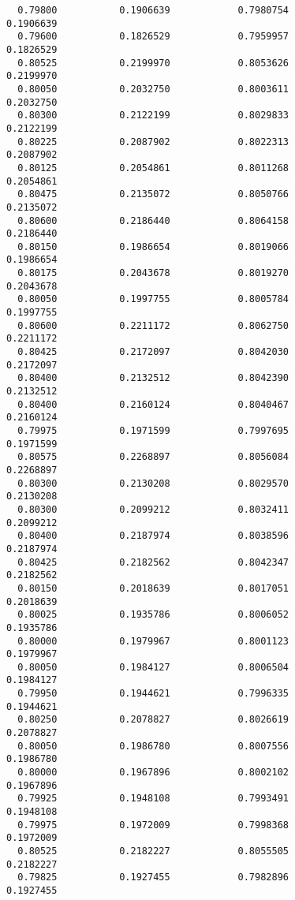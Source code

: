 \documentclass[
  letterpaper,
  DIV=11,
  numbers=noendperiod]{scrartcl}
\begin{document}
\begin{verbatim}
  0.79800           0.1906639            0.7980754            0.1906639     
  0.79600           0.1826529            0.7959957            0.1826529     
  0.80525           0.2199970            0.8053626            0.2199970     
  0.80050           0.2032750            0.8003611            0.2032750     
  0.80300           0.2122199            0.8029833            0.2122199     
  0.80225           0.2087902            0.8022313            0.2087902     
  0.80125           0.2054861            0.8011268            0.2054861     
  0.80475           0.2135072            0.8050766            0.2135072     
  0.80600           0.2186440            0.8064158            0.2186440     
  0.80150           0.1986654            0.8019066            0.1986654     
  0.80175           0.2043678            0.8019270            0.2043678     
  0.80050           0.1997755            0.8005784            0.1997755     
  0.80600           0.2211172            0.8062750            0.2211172     
  0.80425           0.2172097            0.8042030            0.2172097     
  0.80400           0.2132512            0.8042390            0.2132512     
  0.80400           0.2160124            0.8040467            0.2160124     
  0.79975           0.1971599            0.7997695            0.1971599     
  0.80575           0.2268897            0.8056084            0.2268897     
  0.80300           0.2130208            0.8029570            0.2130208     
  0.80300           0.2099212            0.8032411            0.2099212     
  0.80400           0.2187974            0.8038596            0.2187974     
  0.80425           0.2182562            0.8042347            0.2182562     
  0.80150           0.2018639            0.8017051            0.2018639     
  0.80025           0.1935786            0.8006052            0.1935786     
  0.80000           0.1979967            0.8001123            0.1979967     
  0.80050           0.1984127            0.8006504            0.1984127     
  0.79950           0.1944621            0.7996335            0.1944621     
  0.80250           0.2078827            0.8026619            0.2078827     
  0.80050           0.1986780            0.8007556            0.1986780     
  0.80000           0.1967896            0.8002102            0.1967896     
  0.79925           0.1948108            0.7993491            0.1948108     
  0.79975           0.1972009            0.7998368            0.1972009     
  0.80525           0.2182227            0.8055505            0.2182227     
  0.79825           0.1927455            0.7982896            0.1927455     

\end{verbatim}
\end{document}
